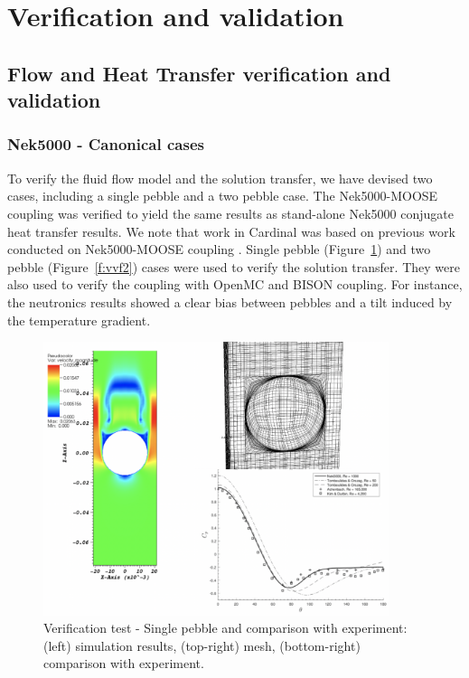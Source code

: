 \section{Verification and validation}
\label{ss:c3}

\subsection{Flow and Heat Transfer verification and validation}

\subsubsection{Nek5000 - Canonical cases}
To verify the fluid flow model and the solution transfer, we have devised two cases, including a single pebble and a two pebble case. The Nek5000-MOOSE coupling was verified to yield the same results as stand-alone Nek5000 conjugate heat transfer results. We note that work in Cardinal was based on previous work conducted on Nek5000-MOOSE coupling \cite{novak2018preliminary}. Single pebble (Figure~\ref{f:vvf1}) and two pebble (Figure~\ref{f:vvf2}) cases were used to verify the solution transfer. They were also used to verify the coupling with OpenMC and BISON coupling. For instance, the neutronics results showed a clear bias between pebbles and a tilt induced by the temperature gradient.

\begin{figure}[!h]
\centering
\includegraphics[clip=true,width=0.9\textwidth]{Figures/pp_vv1a}
\caption{Verification test - Single pebble and comparison with experiment: (left) simulation results, (top-right) mesh, (bottom-right) comparison with experiment.}
\label{f:vvf1}
\end{figure}

